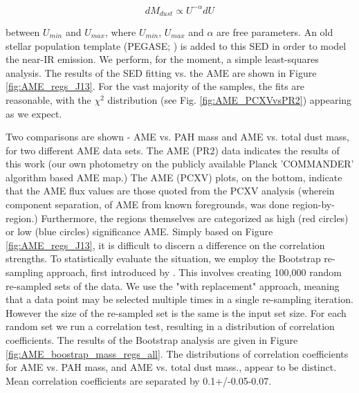 \documentclass[preprint2,longabstract]{aastex}
\begin{document}
\begin{equation}
      dM_{dust}\propto{} U^{-\alpha}dU
 \end{equation}

between $U_{min}$ and $U_{max}$, where $U_{min}$, $U_{max}$ and $\alpha{}$ are free parameters. An old stellar population template (PEGASE; \citep{fioc97}) is added to this SED in order to model the near-IR emission. We perform, for the moment, a simple least-squares analysis. The results of the SED fitting vs. the AME are shown in Figure \ref{fig:AME_regs_J13}. For the vast majority of the samples, the fits are reasonable, with the $\chi^{2}$ distribution (see Fig. \ref{fig:AME_PCXVvsPR2}) appearing as we expect.

     Two comparisons are shown - AME vs. PAH mass and AME vs. total dust mass, for two different AME data sets. The AME (PR2) data indicates the results of this work (our own photometry on the publicly available Planck 'COMMANDER' algorithm based AME map.) The AME (PCXV) plots, on the bottom, indicate that the AME flux values are those quoted from the PCXV analysis (wherein component separation, of AME from known foregrounds, was done region-by-region.) Furthermore, the regions themselves are categorized as high (red circles) or low (blue circles) significance AME. Simply based on Figure \ref{fig:AME_regs_J13}, it is difficult to discern a difference on the correlation strengths. To statistically evaluate the situation, we employ the Bootstrap re-sampling approach, first introduced by \cite{efron79}. This involves creating 100,000 random re-sampled sets of the data. We use the "with replacement" approach, meaning that a data point may be selected multiple times in a single re-sampling iteration. However the size of the re-sampled set is the same is the input set size. For each random set we run a correlation test, resulting in a distribution of correlation coefficients. The results of the Bootstrap analysis are given in Figure \ref{fig:AME_boostrap_mass_regs_all}. The distributions of correlation coefficients for AME vs. PAH mass, and AME vs. total dust mass., appear to be distinct. Mean correlation coefficients are separated by 0.1+/-0.05-0.07.

\end{document}
